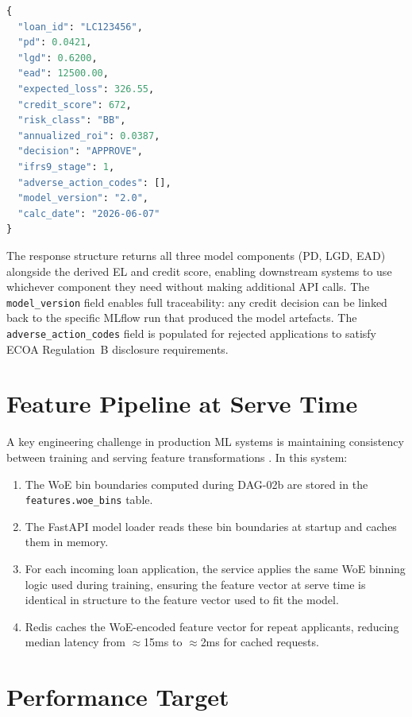\documentclass[12pt,a4paper]{report}
\begin{document}
\begin{lstlisting}[language=Python, caption={FastAPI scoring endpoint response}]
{
  "loan_id": "LC123456",
  "pd": 0.0421,
  "lgd": 0.6200,
  "ead": 12500.00,
  "expected_loss": 326.55,
  "credit_score": 672,
  "risk_class": "BB",
  "annualized_roi": 0.0387,
  "decision": "APPROVE",
  "ifrs9_stage": 1,
  "adverse_action_codes": [],
  "model_version": "2.0",
  "calc_date": "2026-06-07"
}
\end{lstlisting}

\medskip
\noindent The response structure returns all three model components (PD, LGD, EAD) alongside the derived EL and credit score, enabling downstream systems to use whichever component they need without making additional API calls. The \texttt{model\_version} field enables full traceability: any credit decision can be linked back to the specific MLflow run that produced the model artefacts. The \texttt{adverse\_action\_codes} field is populated for rejected applications to satisfy ECOA Regulation~B disclosure requirements.

\section{Feature Pipeline at Serve Time}

A key engineering challenge in production ML systems is maintaining consistency between training and serving feature transformations \cite{sculley2015}. In this system:
\begin{enumerate}
  \item The WoE bin boundaries computed during DAG-02b are stored in the \texttt{features.woe\_bins} table.
  \item The FastAPI model loader reads these bin boundaries at startup and caches them in memory.
  \item For each incoming loan application, the service applies the same WoE binning logic used during training, ensuring the feature vector at serve time is identical in structure to the feature vector used to fit the model.
  \item Redis caches the WoE-encoded feature vector for repeat applicants, reducing median latency from $\approx$15ms to $\approx$2ms for cached requests.
\end{enumerate}

\section{Performance Target}
\end{document}
